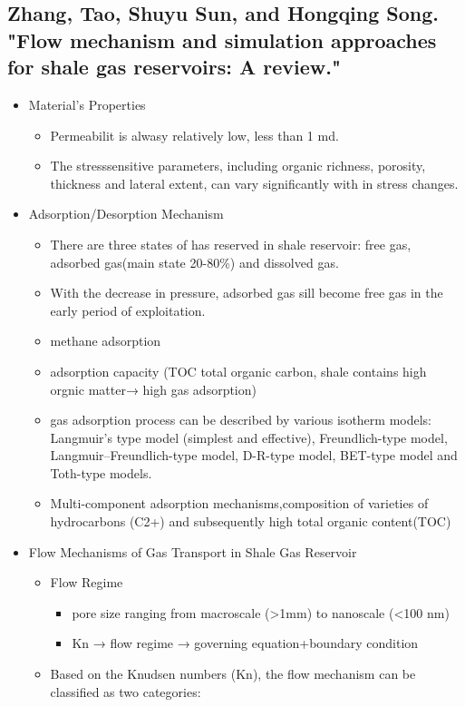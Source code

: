 \subsection{Zhang, Tao, Shuyu Sun, and Hongqing Song. "Flow mechanism and simulation approaches for shale gas reservoirs: A review."  \citep{zhang2019flow}}
\begin{itemize}
\item Material’s Properties
\begin{itemize}
\item Permeabilit is alwasy relatively low, less than 1 md.
\item The stresssensitive parameters, including organic richness, porosity, thickness and lateral extent, can vary significantly with in stress changes.
\end{itemize}
\item Adsorption/Desorption Mechanism
\begin{itemize}
\item There are three states of has reserved in shale reservoir: free gas, adsorbed gas(main state 20-80\%) and dissolved gas.
\item With the decrease in pressure, adsorbed gas sill become free gas in the early period of exploitation.
\item methane adsorption
\item adsorption capacity (TOC total organic carbon, shale contains high orgnic matter→ high gas adsorption)
\item gas adsorption process can be described by various isotherm models: Langmuir’s type model (simplest and effective), Freundlich-type model, Langmuir–Freundlich-type model, D-R-type model, BET-type model and Toth-type models.
\item Multi-component adsorption mechanisms,composition of varieties of hydrocarbons (C2+) and subsequently high total organic content(TOC)
\end{itemize}
\item Flow Mechanisms of Gas Transport in Shale Gas Reservoir
\begin{itemize}
\item Flow Regime
\begin{itemize}
\item pore size ranging from macroscale (>1mm) to nanoscale (<100 nm)
\item Kn → flow regime → governing equation+boundary condition
\end{itemize}
\item  Based on the Knudsen numbers (Kn), the flow mechanism can be classified as two categories:

\end{itemize}
\end{itemize}
